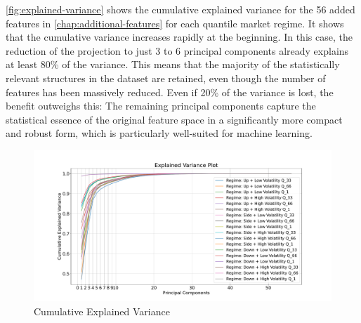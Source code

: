 \autoref{fig:explained-variance} shows the cumulative explained variance for the 56 added features in \autoref{chap:additional-features} for each quantile market regime.
It shows that the cumulative variance increases rapidly at the beginning.
In this case, the reduction of the projection to just 3 to 6 principal components already explains at least 80\% of the variance.
This means that the majority of the statistically relevant structures in the dataset are retained, even though the number of features has been massively reduced.
Even if 20\% of the variance is lost, the benefit outweighs this: The remaining principal components capture the statistical essence of the original feature space in a significantly more compact and robust form, which is particularly well-suited for machine learning.


\begin{figure}[H]
    \centering
    \includegraphics[width=\textwidth]{images/eda/explained_variance}
    \caption{Cumulative Explained Variance}
    \label{fig:explained-variance}
\end{figure}

